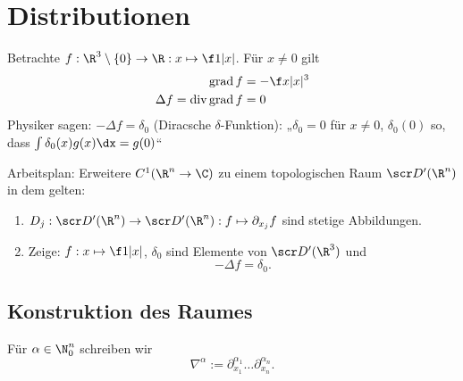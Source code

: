 
\chapter{Distributionen}


Betrachte $f : \R^3 \setminus \{0\} \to \R : x \mapsto \f 1{|x|}$.
Für $x \neq 0$ gilt
\begin{align*}
	\grad f &= - \f x{|x|^3} \\
	\Delta f = \div \grad f &= 0
\end{align*}
Physiker sagen: $-\Delta f = \delta_0$ (Diracsche $\delta$-Funktion):
„$\delta_0 = 0$ für $x \neq 0$, $\delta_0(0)$ so, dass $\int \delta_0(x)g(x) \dx = g(0)$“

Arbeitsplan: Erweitere $C^1(\R^n \to \C)$ zu einem topologischen Raum $\scr D'(\R^n)$ in dem gelten:
\begin{enumerate}[1)]
	\item
		$D_j : \scr D'(\R^n) \to \scr D'(\R^n) : f \mapsto \partial_{x_j} f$ sind stetige Abbildungen.
	\item
		Zeige: $f : x \mapsto \f 1{|x|}$, $\delta_0$ sind Elemente von $\scr D'(\R^3)$ und
		\[
			-\Delta f = \delta_0.
		\]
\end{enumerate}


\section{Konstruktion des Raumes}


\begin{conv} \label{5.1}
	Für $\alpha \in \N_0^n$ schreiben wir
	\[
		\nabla^\alpha := \partial_{x_1}^{\alpha_1} \dotso \partial_{x_n}^{\alpha_n}.
	\]
\end{conv}


